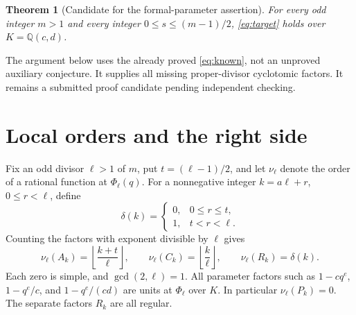\documentclass[11pt,a4paper]{article}
\newtheorem{theorem}{Theorem}[section]
\begin{document}
\begin{theorem}[Candidate for the formal-parameter assertion]\label{thm:main}
For every odd integer $m>1$ and every integer $0\leq s\leq(m-1)/2$,
\eqref{eq:target} holds over $K=\mathbb Q(c,d)$.
\end{theorem}
The argument below uses the already proved \eqref{eq:known}, not an
unproved auxiliary conjecture. It supplies all missing proper-divisor
cyclotomic factors. It remains a submitted proof candidate pending
independent checking.

\section{Local orders and the right side}
Fix an odd divisor $\ell>1$ of $m$, put $t=(\ell-1)/2$, and let
$\nu_\ell$ denote the order of a rational function at $\Phi_\ell(q)$.
For a nonnegative integer $k=a\ell+r$, $0\leq r<\ell$, define
\[
 \delta(k)=\begin{cases}0,&0\leq r\leq t,\\1,&t<r<\ell.\end{cases}
\]
Counting the factors with exponent divisible by $\ell$ gives
\begin{equation}\label{eq:valuations}
 \nu_\ell(A_k)=\left\lfloor\frac{k+t}{\ell}\right\rfloor,
 \qquad \nu_\ell(C_k)=\left\lfloor\frac{k}{\ell}\right\rfloor,
 \qquad \nu_\ell(R_k)=\delta(k).
\end{equation}
Each zero is simple, and $\gcd(2,\ell)=1$. All parameter factors such as
$1-cq^e$, $1-q^e/c$, and $1-q^e/(cd)$ are units at $\Phi_\ell$ over $K$.
In particular $\nu_\ell(P_k)=0$. The separate factors $R_k$ are all regular.
\end{document}
